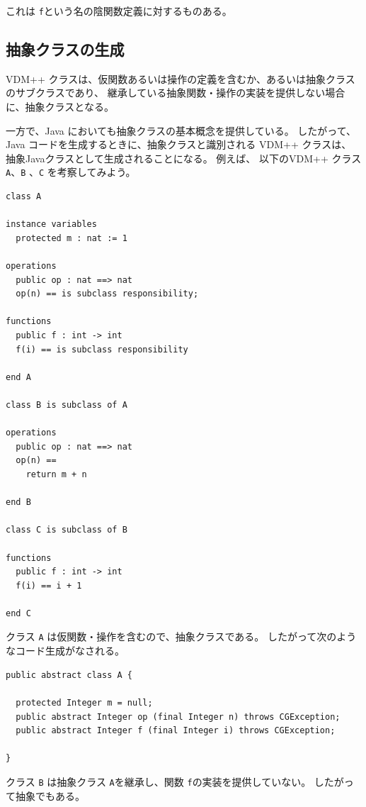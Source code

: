 \documentclass[\pformat,11pt]{jarticle}
\begin{document}
これは {\tt f}という名の陰関数定義に対するものある。

\subsection{抽象クラスの生成}

VDM++ クラスは、仮関数あるいは操作の定義を含むか、あるいは抽象クラスのサブクラスであり、
継承している抽象関数・操作の実装を提供しない場合に、抽象クラスとなる。

一方で、Java においても抽象クラスの基本概念を提供している。
したがって、Java コードを生成するときに、抽象クラスと識別される VDM++ クラスは、
抽象Javaクラスとして生成されることになる。
例えば、 以下のVDM++ クラス \texttt{A}、\texttt{B} 、\texttt{C} を考察してみよう。

\begin{screen}
\begin{verbatim}
class A

instance variables
  protected m : nat := 1

operations
  public op : nat ==> nat
  op(n) == is subclass responsibility;

functions
  public f : int -> int
  f(i) == is subclass responsibility

end A

class B is subclass of A

operations
  public op : nat ==> nat
  op(n) ==
    return m + n

end B

class C is subclass of B

functions
  public f : int -> int
  f(i) == i + 1

end C
\end{verbatim}
\end{screen}

クラス \texttt{A} は仮関数・操作を含むので、抽象クラスである。
したがって次のようなコード生成がなされる。

\begin{screen}
\begin{verbatim}
public abstract class A {
 
  protected Integer m = null;
  public abstract Integer op (final Integer n) throws CGException;
  public abstract Integer f (final Integer i) throws CGException;
 
} 
\end{verbatim}
\end{screen}
クラス \texttt{B} は抽象クラス \texttt{A}を継承し、関数 \texttt{f}の実装を提供していない。
したがって抽象でもある。
\end{document}
